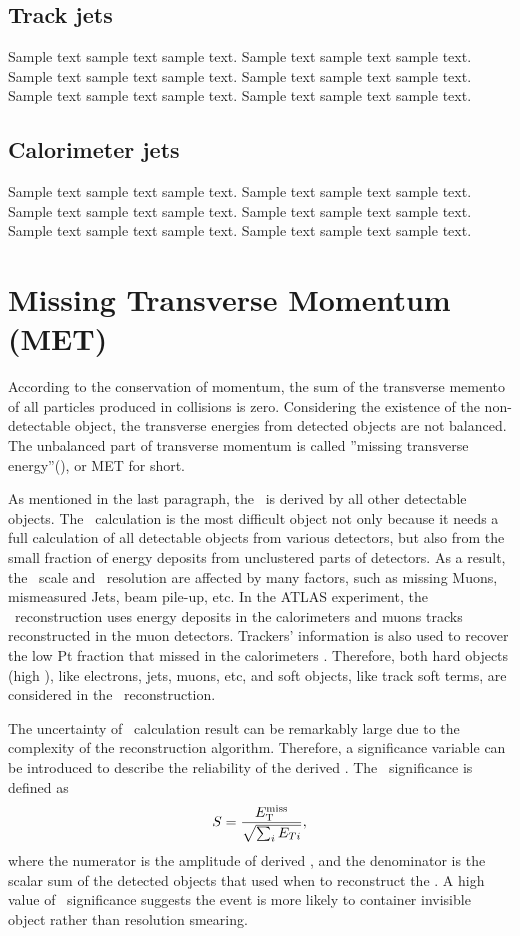 \subsection{Track jets}
\label{sec:track}
Sample text sample text sample text. Sample text sample text sample text.
Sample text sample text sample text. Sample text sample text sample text.
Sample text sample text sample text. Sample text sample text sample text.

\subsection{Calorimeter jets}
\label{sec:calo}
Sample text sample text sample text. Sample text sample text sample text.
Sample text sample text sample text. Sample text sample text sample text.
Sample text sample text sample text. Sample text sample text sample text.

\section{Missing Transverse Momentum (MET)}
\label{sec:met}
\par According to the conservation of momentum, the sum of the transverse memento of all particles produced in collisions is zero. Considering the existence of the non-detectable object, the transverse energies from detected objects are not balanced. The unbalanced part of transverse momentum is called ''missing transverse energy''(\met), or MET for short.

\par As mentioned in the last paragraph, the \met~is derived by all other detectable objects. The \met~calculation is the most difficult object not only because it needs a full calculation of all detectable objects from various detectors, but also from the small fraction of energy deposits from unclustered parts of detectors. As a result, the \met~scale and \met~resolution are affected by many factors, such as missing Muons, mismeasured Jets, beam pile-up, etc. In the ATLAS experiment, the \met~reconstruction uses energy deposits in the calorimeters and muons tracks reconstructed in the muon detectors. Trackers' information is also used to recover the low Pt fraction that missed in the calorimeters \cite{ATLAS-CONF-2013-082}. Therefore, both hard objects (high \pt), like electrons, jets, muons, etc, and soft objects, like track soft terms, are considered in the \met~reconstruction.

\par The uncertainty of \met~calculation result can be remarkably large due to the complexity of the reconstruction algorithm. Therefore, a significance variable can be introduced to describe the reliability of the derived \met. The \met~significance is defined as
$$ S=\frac{E_{\mathrm{T}}^{\mathrm{miss}}}{\sqrt{\sum_{i}E_{Ti}}}, $$
where the numerator is the amplitude of derived \met, and the denominator is the scalar sum of the detected objects that used when to reconstruct the \met. A high value of \met~significance suggests the event is more likely to container invisible object rather than resolution smearing.
